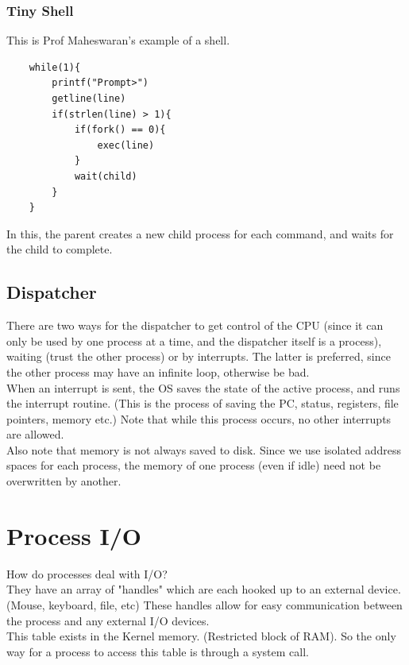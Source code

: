 \documentclass[12pt]{article}
\theoremstyle{definition}
\begin{document}
\subsubsection{Tiny Shell}
This is Prof Maheswaran's example of a shell.
\begin{lstlisting}
	while(1){
		printf("Prompt>")
		getline(line)
		if(strlen(line) > 1){
			if(fork() == 0){
				exec(line)
			}
			wait(child)
		}
	}
\end{lstlisting}
In this, the parent creates a new child process for each command, and waits for the child to complete.

\subsection{Dispatcher}
There are two ways for the dispatcher to get control of the CPU (since it can only be used by one process at a time, and the dispatcher itself is a process), waiting (trust the other process) or by interrupts. The latter is preferred, since the other process may have an infinite loop, otherwise be bad.
\\ \linebreak
When an interrupt is sent, the OS saves the state of the active process, and runs the interrupt routine. (This is the process of saving the PC, status, registers, file pointers, memory etc.)
Note that while this process occurs, no other interrupts are allowed.
\\ \linebreak
Also note that memory is not always saved to disk. Since we use isolated address spaces for each process, the memory of one process (even if idle) need not be overwritten by another.

\section{Process I/O}
How do processes deal with I/O?
\\ \linebreak
They have an array of "handles" which are each hooked up to an external device. (Mouse, keyboard, file, etc) These handles allow for easy communication between the process and any external I/O devices.
\\ \linebreak
This table exists in the Kernel memory. (Restricted block of RAM).
So the only way for a process to access this table is through a system call.
\\ \linebreak
\end{document}
